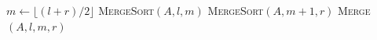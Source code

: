 \documentclass[border=4pt]{standalone}
\begin{document}
\begin{algorithm}[H]
  \SetAlgoLined
  $m \leftarrow \lfloor (l + r) / 2 \rfloor$\;
  \textsc{MergeSort}$(A, l, m)$\;
  \textsc{MergeSort}$(A, m+1, r)$\;
  \textsc{Merge}$(A, l, m, r)$\;
  \caption{\textsc{MergeSort}}
\end{algorithm}
\end{document}
